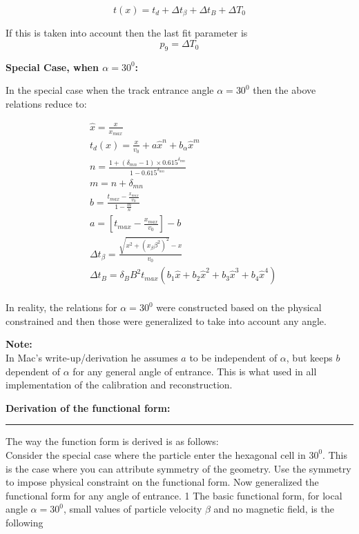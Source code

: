\documentclass[12pt]{article}
\begin{document}
\begin{equation}\label{}
t(x) = t_d + \Delta t_\beta + \Delta t_B + \Delta T_0
\end{equation}

If this is taken into account then the last fit parameter is
\begin{equation}\label{}
p_9 = \Delta T_0
\end{equation}


\textbf{Special Case, when $\alpha = 30^0$:}

In the special case when the track entrance angle $\alpha = 30^0$ then the above relations reduce to:

\begin{equation}\label{}
\begin{split}
& \hat x = \frac{x}{x_{max}}\\
& t_d(x) = \frac{x}{v_0} + a\hat x^n + b_\alpha \hat x^m \\
& n = \frac{1 + (\delta_{mn} - 1) \times 0.615^{\delta_{mn}}}{1 - 0.615^{\delta_{mn}}}\\
& m = n + \delta_{mn} \\
& b = \frac{t_{max} - \frac{x_{max}}{v_0}}{1 - \frac{m}{n}}\\
& a  = [t_{max} - \frac{x_{max}}{v_0}] - b\\
& \Delta t_\beta = \frac{\sqrt{x^2 + (x_\beta \beta^2)^2} - x}{v_0} \\
& \Delta t_B = \delta_B B^2 t_{max} (b_1\hat x + b_2 \hat x^2 + b_3\hat x^3 + b_4\hat x^4)\\
\end{split}
\end{equation}

In reality, the relations for $\alpha = 30^0$ were constructed based on the physical constrained and then those were generalized to take into account any angle.

\textbf{Note:}\\
In Mac's write-up/derivation he assumes $a$ to be independent of $\alpha$, but keeps $b$ dependent of $\alpha$ for any general angle of entrance. This is what used in all implementation of the calibration and reconstruction.


\newpage
\textbf{Derivation of the functional form:}\\
{\color{black} \rule{\linewidth}{0.5mm} }

The way the function form is derived is as follows:\\
Consider the special case where the particle enter the hexagonal cell in $30^0$. This is the case where you can attribute symmetry of the geometry. Use the symmetry to impose physical constraint on the functional form. Now generalized the functional form for any angle of entrance.
1
The basic functional form, for local angle $\alpha = 30^0$, small values of particle velocity $\beta$ and no magnetic field, is the following
\end{document}
